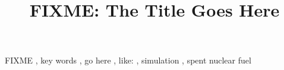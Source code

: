 \documentclass[review]{elsarticle}
\begin{document}
\begin{frontmatter}
\title{FIXME: The Title Goes Here}






\begin{keyword}
FIXME \sep
key words \sep
go here \sep
like: \sep 
simulation \sep
spent nuclear fuel 
\end{keyword}


\end{frontmatter}
\glsresetall

\linenumbers









%
\end{document}
